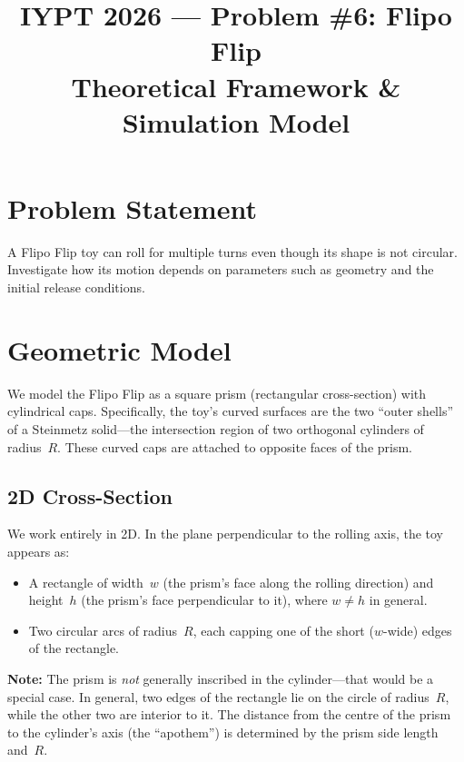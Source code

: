 \documentclass[11pt,a4paper]{article}
\title{%
  \vspace{-1cm}
  {\LARGE\bfseries IYPT 2026 --- Problem \#6: Flipo Flip}\\[6pt]
  {\large Theoretical Framework \& Simulation Model}
}
\author{}
\date{}
\begin{document}
\maketitle
\thispagestyle{empty}

\section{Problem Statement}

A Flipo Flip toy can roll for multiple turns even though its shape is not circular.
Investigate how its motion depends on parameters such as geometry and the initial
release conditions.

\section{Geometric Model}

We model the Flipo Flip as a square prism (rectangular cross-section) with cylindrical
caps.  Specifically, the toy's curved surfaces are the two ``outer shells'' of a
Steinmetz solid---the intersection region of two orthogonal cylinders of radius~$R$.
These curved caps are attached to opposite faces of the prism.

\subsection{2D Cross-Section}

We work entirely in 2D\@.  In the plane perpendicular to the rolling axis, the toy
appears as:
\begin{itemize}[nosep]
  \item A rectangle of width~$w$ (the prism's face along the rolling direction) and
        height~$h$ (the prism's face perpendicular to it), where $w \neq h$ in general.
  \item Two circular arcs of radius~$R$, each capping one of the short ($w$-wide) edges
        of the rectangle.
\end{itemize}

\textbf{Note:} The prism is \emph{not} generally inscribed in the cylinder---that would
be a special case.  In general, two edges of the rectangle lie on the circle of
radius~$R$, while the other two are interior to it.  The distance from the centre of the
prism to the cylinder's axis (the ``apothem'') is determined by the prism
side length and~$R$.
\end{document}
